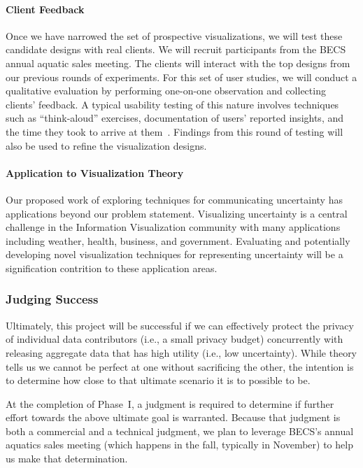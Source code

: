 \paragraph{Client Feedback}
Once we have narrowed the set of prospective visualizations, we will test these candidate designs with real clients. 
We will recruit participants from the BECS annual aquatic sales meeting.   
The clients will interact with the top designs from our previous rounds of experiments. 
For this set of user studies, we will conduct a qualitative evaluation by performing one-on-one observation and collecting clients' feedback.
A typical usability testing of this nature involves techniques such as “think-aloud” exercises, documentation of users’ reported insights, and the time they took to arrive at them~\cite{charlton2001handbook,hix1993developing,lewis1982using}. Findings from this round of testing will also be used to refine the visualization designs.

\paragraph{Application to Visualization Theory} 
Our proposed work of exploring techniques for communicating uncertainty has applications beyond our problem statement. Visualizing uncertainty is a central challenge in the Information Visualization community with many applications including weather, health, business, and government. Evaluating and potentially developing novel visualization techniques for representing uncertainty will be a signification contrition to these application areas.  


\subsubsection{Judging Success}

Ultimately, this project will be successful if we can effectively
protect the privacy of individual data contributors (i.e., a small
privacy budget) concurrently with releasing aggregate data that has
high utility (i.e., low uncertainty).  While theory tells us we cannot
be perfect at one without sacrificing the other, the intention
is to determine how close to that ultimate scenario it is to possible to be.

At the completion of Phase~I, a judgment is required to determine if
further effort towards the above ultimate goal is warranted.
Because that judgment is both a commercial and a technical judgment, we
plan to leverage BECS's annual aquatics sales meeting (which happens in
the fall, typically in November) to help us make that determination.

